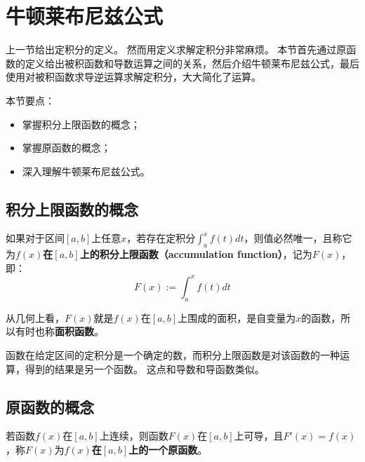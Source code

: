 \section{牛顿莱布尼兹公式}

上一节给出定积分的定义。
然而用定义求解定积分非常麻烦。
本节首先通过原函数的定义给出被积函数和导数运算之间的关系，然后介绍牛顿莱布尼兹公式，最后使用对被积函数求导逆运算求解定积分，大大简化了运算。

本节要点：
\begin{itemize}
    \item 掌握积分上限函数的概念；
    \item 掌握原函数的概念；
    \item 深入理解牛顿莱布尼兹公式。
\end{itemize}

\subsection{积分上限函数的概念}

\begin{definition}[积分上限函数]
如果对于区间$\left[ a,b \right] $上任意$x$，若存在定积分$\int_a^x{f\left( t \right) dt}$，则值必然唯一，且称它为{\bf $f\left( x \right) $在$\left[ a,b \right] $上的积分上限函数（accumulation function）}，记为$F\left( x \right) $，即：
\[
F\left( x \right) :=\int_a^x{f\left( t \right) dt}
\]
\end{definition}

从几何上看，$F\left( x \right) $就是$f\left( x \right) $在$\left[ a,b \right] $上围成的面积，是自变量为$x$的函数，所以有时也称{\bf 面积函数}。

函数在给定区间的定积分是一个确定的数，而积分上限函数是对该函数的一种运算，得到的结果是另一个函数。
这点和导数和导函数类似。

\subsection{原函数的概念}

\begin{definition}[原函数]
若函数$f\left( x \right) $在$\left[ a,b \right] $上连续，则函数$F\left( x \right) $在$\left[ a,b \right] $上可导，且$F'\left( x \right) =f\left( x \right) $，称$F\left( x \right) $为{\bf $f\left( x \right) $在$\left[ a,b \right] $上的一个原函数}。
\end{definition}

